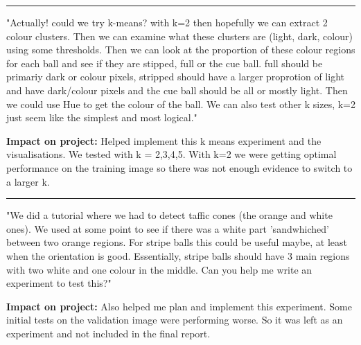 \documentclass[12pt,a4paper]{article}
\newenvironment{promptentry}{%
    \par\Needspace{7\baselineskip}\addvspace{1.2em}
    \hrule
    \nobreak\vspace{0.5em}
}{\par\addvspace{0.5em}}
\newenvironment{aiprompt}{%
    \begin{list}{}{%
        \setlength{\leftmargin}{1em}%
        \setlength{\rightmargin}{1em}%
        \setlength{\topsep}{0.3em}%
        \setlength{\parsep}{0pt}%
    }%
    \item\relax
}{\end{list}}
\begin{document}
\begin{promptentry}

\begin{aiprompt}
"Actually! could we try k-means? with k=2 then hopefully we can extract 2 colour clusters.
Then we can examine what these clusters are (light, dark, colour) using some
thresholds. Then we can look at the proportion of these colour regions for each
ball and see if they are stipped, full or the cue ball. 
full should be primariy dark or colour pixels, stripped should have a larger proprotion of light and 
have dark/colour pixels and the cue ball should be all or mostly light.
Then we could use Hue to get the colour of the ball. 
We can also test other k sizes, k=2 just seem like the simplest and most logical."
\end{aiprompt}

\textbf{Impact on project:} Helped implement this k means experiment and the visualisations.
We tested with k = 2,3,4,5. 
With k=2 we were getting optimal performance on the training image so there was not enough evidence to switch to a 
larger k.

\end{promptentry}
\FloatBarrier

\begin{promptentry}

\begin{aiprompt}
"We did a tutorial where we had to detect taffic cones (the orange and white ones). 
We used at some point to see if there was a white part 'sandwhiched' between two orange 
regions. For stripe balls this could be useful maybe, at least when the orientation is good.
Essentially, stripe balls should have 3 main regions with two white and one colour in the middle.
Can you help me write an experiment to test this?"
\end{aiprompt}

\textbf{Impact on project:} Also helped me plan and implement this experiment. 
Some initial tests on the validation image were performing worse. So it was left as an experiment
and not included in the final report.

\end{promptentry}
\FloatBarrier
\end{document}
